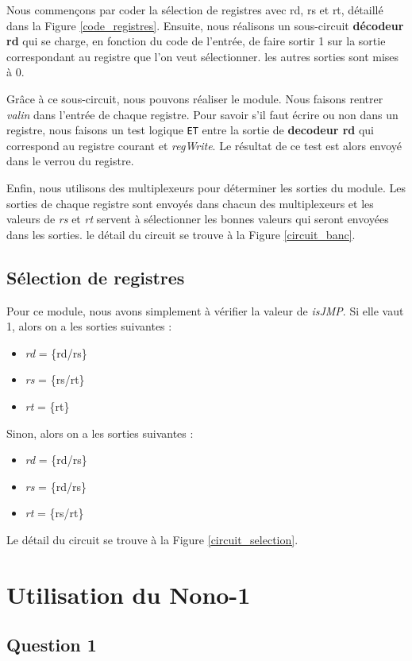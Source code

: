 \documentclass[10pt,a4paper]{article}
\begin{document}
Nous commençons par coder la sélection de registres avec rd, rs et rt, détaillé dans la Figure \ref{code_registres}. Ensuite, nous réalisons un sous-circuit \textbf{décodeur rd} qui se charge, en fonction du code de l'entrée, de faire sortir 1 sur la sortie correspondant au registre que l'on veut sélectionner. les autres sorties sont mises à 0. 

Grâce à ce sous-circuit, nous pouvons réaliser le module. Nous faisons rentrer \textit{valin} dans l'entrée de chaque registre. Pour savoir s'il faut écrire ou non dans un registre, nous faisons un test logique \verb|ET| entre la sortie de \textbf{decodeur rd} qui correspond au registre courant et \textit{regWrite}. Le résultat de ce test est alors envoyé dans le verrou du registre.

Enfin, nous utilisons des multiplexeurs pour déterminer les sorties du module. Les sorties de chaque registre sont envoyés dans chacun des multiplexeurs et les valeurs de \textit{rs} et \textit{rt} servent à sélectionner les bonnes valeurs qui seront envoyées dans les sorties. le détail du circuit se trouve à la Figure \ref{circuit_banc}. 

\subsection{Sélection de registres}

Pour ce module, nous avons simplement à vérifier la valeur de \textit{isJMP}. Si elle vaut 1, alors on a les sorties suivantes :
\begin{itemize}
\item \textit{rd} = \{rd/rs\}
\item \textit{rs} = \{rs/rt\}
\item \textit{rt} = \{rt\}
\end{itemize}
Sinon, alors on a les sorties suivantes :
\begin{itemize}
\item \textit{rd} = \{rd/rs\}
\item \textit{rs} = \{rd/rs\}
\item \textit{rt} = \{rs/rt\}
\end{itemize}
Le détail du circuit se trouve à la Figure \ref{circuit_selection}.

\section{Utilisation du Nono-1}

\subsection{Question 1}
\end{document}

